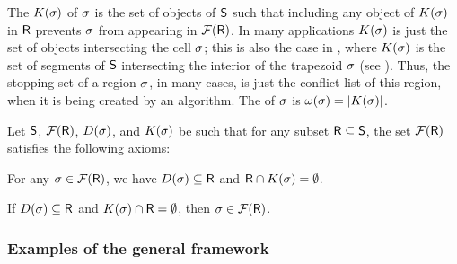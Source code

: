 
The  $\KillSet{ \Trap }$ of $\sigma$ is the set of
objects of $\mathsf{S}$ such that including any object of $\KillSet{
   \Trap }$ in $\mathsf{R}$ prevents $\sigma$ from appearing in
$\RegionsSet{\Sample }$.  In many applications $\KillSet{ \Trap }$ is
just the set of objects intersecting the cell $\sigma$; this is also
the case in , where $\KillSet{\Trap}$ is the set of
segments of $\mathsf{S}$ intersecting the interior of the trapezoid
$\sigma$ (see ).  Thus, the stopping set of a
region $\sigma$, in many cases, is just the conflict list of this
region, when it is being created by an \RIC algorithm.  The
 of $\sigma$ is $\WeightX{\Trap} =
\cardin{\KillSet{\Trap}}$.


\bigskip

\begin{defn}
    Let $\mathsf{S}$, $\RegionsSet{\Sample}$, $\DefSet{\Trap}$, and
    $\KillSet{\Trap}$ be such that for any subset
    $\mathsf{R} \subseteq \mathsf{S}$, the set $\RegionsSet{\Sample}$
    satisfies the following axioms:
    \begin{compactenumi}
        \item {} For any
        $\Trap \in \RegionsSet{\Sample}$, we have
        $\DefSet{\Trap} \subseteq \Sample$ and
        $\Sample \cap \KillSet{\Trap} = \emptyset$.
    
        \item {} If $\DefSet{\Trap} \subseteq \Sample$
        and $\KillSet{ \Trap }\cap \Sample=\emptyset$, then
        $\Trap\in \RegionsSet{\Sample}$.
    \end{compactenumi}
\end{defn}


\subsubsection{Examples of the general framework}


